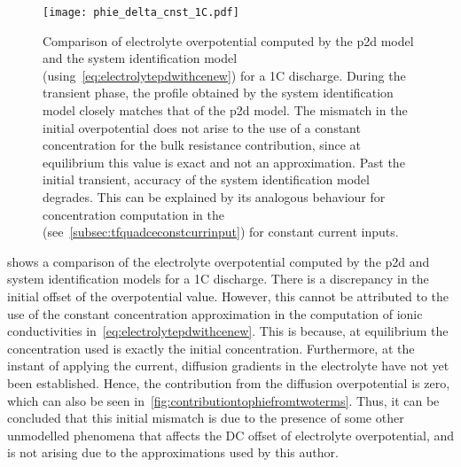 \begin{figure}[!htbp]
    \centering
    \texttt{[image: phie\_delta\_cnst\_1C.pdf]}
    \caption[%
    Electrolyte  overpotential  computed  by the    and  system
    identification models for a 1C discharge
    ]%
    {%
        Comparison    of    electrolyte    overpotential   computed    by    the
        \gls{p2d}     model    and     the    system     identification    model
        (using~\cref{eq:electrolytepdwithcenew}) for a  1C discharge. During the
        transient phase, the profile obtained by the system identification model
        closely matches that of the \gls{p2d} model. The mismatch in the initial
        overpotential does not arise to the  use of a constant concentration for
        the bulk  resistance contribution,  since at  equilibrium this  value is
        exact and  not an  approximation. Past  the initial  transient, accuracy
        of  the system  identification  model degrades.  This  can be  explained
        by  its  analogous  behaviour   for  concentration  computation  in  the
         (see~\cref{subsec:tfquadceconstcurrinput}) for constant
        current inputs.
    }%
    \label{fig:phiedeltacnst1C}
\end{figure}

 shows  a comparison of the  electrolyte overpotential
computed  by   the  \gls{p2d}  and   system  identification  models  for   a  1C
discharge. There  is a discrepancy  in the  initial offset of  the overpotential
value.  However,  this  cannot  be  attributed   to  the  use  of  the  constant
concentration  approximation   in  the   computation  of   ionic  conductivities
in~\cref{eq:electrolytepdwithcenew}.  This   is  because,  at   equilibrium  the
concentration used  is exactly  the initial  concentration. Furthermore,  at the
instant of applying the current, diffusion gradients in the electrolyte have not
yet been established.  Hence, the contribution from  the diffusion overpotential
is zero,  which can  also be  seen in~\cref{fig:contributiontophiefromtwoterms}.
Thus, it can be  concluded that this initial mismatch is due  to the presence of
some  other unmodelled  phenomena  that  affects the  DC  offset of  electrolyte
overpotential, and is not arising due to the approximations used by this author.

